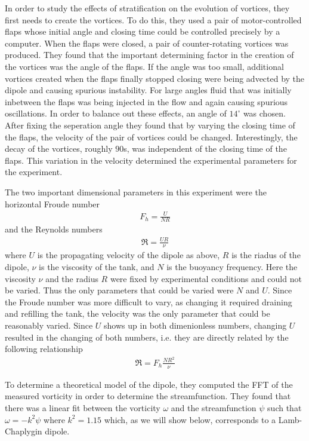 In order to study the effects of stratification on the evolution of vortices, they first needs to create the vortices. To do this, they used a pair of motor-controlled flaps whose initial angle and closing time could be controlled precisely by a computer. When the flaps were closed, a pair of counter-rotating vortices was produced. They found that the important determining factor in the creation of the vortices was the angle of the flaps. If the angle was too small, additional vortices created when the flaps finally stopped closing were being advected by the dipole and causing spurious instability. For large angles fluid that was initially inbetween the flaps was being injected in the flow and again causing spurious oscillations. In order to balance out these effects, an angle of $14^{\circ}$ was chosen. After fixing the seperation angle they found that by varying the closing time of the flaps, the velocity of the pair of vortices could be changed. Interestingly, the decay of the vortices, roughly $90$s, was independent of the closing time of the flaps. This variation in the velocity determined the experimental parameters for the experiment.

The two important dimensional parameters in this experiment were the horizontal Froude number 
\begin{align}
F_{h} = \frac{U}{NR}
\end{align}
and the Reynolds numbers
\begin{align}
\Re= \frac{UR}{\nu}
\end{align}
where $U$ is the propagating velocity of the dipole as above, $R$ is the riadus of the dipole, $\nu$ is the viscosity of the tank, and $N$ is the buoyancy frequency. Here the viscosity $\nu$ and the radius $R$ were fixed by experimental conditions and could not be varied. Thus the only parameters that could be varied were $N$ and $U$. Since the Froude number was more difficult to vary, as changing it required draining and refilling the tank, the velocity was the only parameter that could be reasonably varied. Since $U$ shows up in both dimenionless numbers, changing $U$ resulted in the changing of both numbers, i.e. they are directly related by the following relationship
\begin{align}
\Re = F_{h}\frac{NR^{2}}{\nu}
\end{align}

To determine a theoretical model of the dipole, they computed the FFT of the measured vorticity in order to determine the streamfunction. They found that there was a linear fit between the vorticity $\omega$ and the streamfunction $\psi$ such that $\omega = -k^{2}\psi$ where $k^{2}=1.15$ which, as we will show below, corresponds to a Lamb-Chaplygin dipole. 

